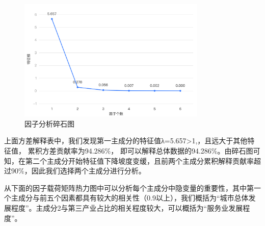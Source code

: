 \documentclass[12pt, a4paper, oneside]{ctexart}
\begin{document}
\begin{table}[H]
  \centering
  \caption{总方差解释}
  \label{tab:总方差}
\end{table}


\begin{figure}[H]
  \centering
  \includegraphics[width=0.8\textwidth]{pic/因子分析碎石图.png}
  \caption{因子分析碎石图}
  \label{fig:因子分析碎石图}
\end{figure}

上面方差解释表中，我们发现第一主成分的特征值λ=5.657\textgreater1,，且远大于其他特征值，
累积方差贡献率为94.286\%，
即可以解释总体数据的94.286\%。由碎石图可知，在第二个主成分开始特征值下降坡度变缓，且前两个主成分累积解释贡献率超过90\%，因此我们选择两个主成分进行分析。

从下面的因子载荷矩阵热力图中可以分析每个主成分中隐变量的重要性，其中第一个主成分与前五个因素都具有较大的相关性（0.9以上），我们概括为``城市总体发展程度''。主成分2与第三产业占比的相关程度较大，可以概括为``服务业发展程度''。
\end{document}
